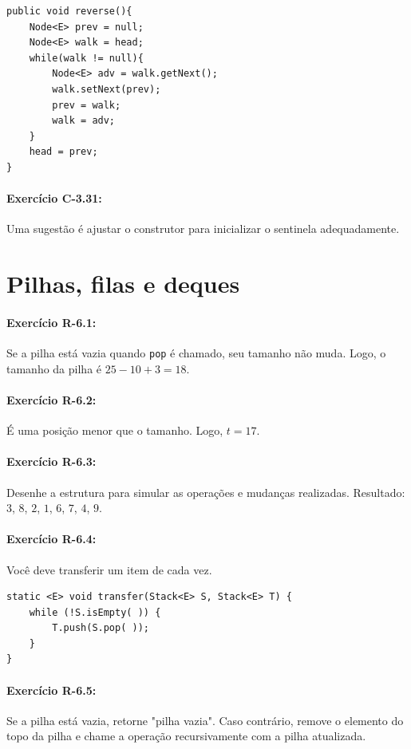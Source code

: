 \begin{lstlisting}[frame=single]
public void reverse(){
	Node<E> prev = null;
	Node<E> walk = head;
	while(walk != null){
		Node<E> adv = walk.getNext();
		walk.setNext(prev);
		prev = walk;
		walk = adv;
	}
	head = prev;
}
\end{lstlisting}

\paragraph{Exercício C-3.31:}
Uma sugestão é ajustar o construtor para inicializar o sentinela adequadamente.


\section{Pilhas, filas e deques}

\paragraph{Exercício R-6.1:}
Se a pilha está vazia quando \texttt{pop} é chamado, seu tamanho não muda. Logo, o tamanho da pilha é $25 - 10 + 3 = 18$.

\paragraph{Exercício R-6.2:}
É uma posição menor que o tamanho. Logo, $t = 17$.

\paragraph{Exercício R-6.3:}
Desenhe a estrutura para simular as operações e mudanças realizadas. Resultado: $3$, $8$, $2$, $1$, $6$, $7$, $4$, $9$.

\paragraph{Exercício R-6.4:}
Você deve transferir um item de cada vez.

\begin{lstlisting}[frame=single]
static <E> void transfer(Stack<E> S, Stack<E> T) {
	while (!S.isEmpty( )) {
		T.push(S.pop( ));
	}
}
\end{lstlisting}

\paragraph{Exercício R-6.5:}
Se a pilha está vazia, retorne "pilha vazia". Caso contrário, remove o elemento do topo da pilha e chame a operação recursivamente com a pilha atualizada.

